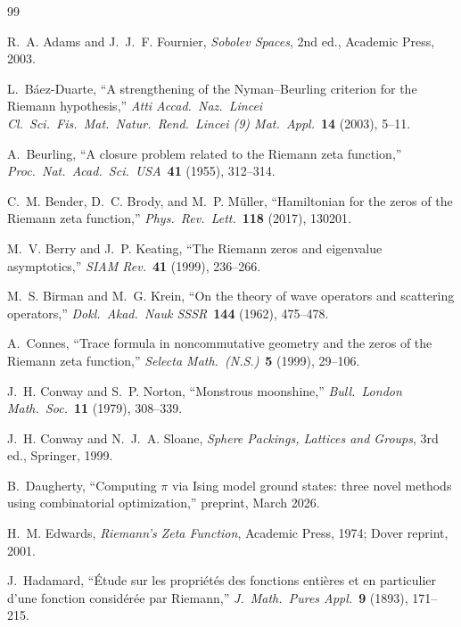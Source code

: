 \documentclass[11pt,a4paper]{article}
\theoremstyle{plain}
\theoremstyle{remark}
\begin{document}
\begin{thebibliography}{99}

R.~A. Adams and J.~J.~F. Fournier,
\emph{Sobolev Spaces}, 2nd ed., Academic Press, 2003.

L.~B\'aez-Duarte,
``A strengthening of the Nyman--Beurling criterion for the Riemann
hypothesis,''
\emph{Atti Accad.\ Naz.\ Lincei Cl.\ Sci.\ Fis.\ Mat.\ Natur.\
Rend.\ Lincei (9) Mat.\ Appl.}\ \textbf{14} (2003), 5--11.

A.~Beurling,
``A closure problem related to the Riemann zeta function,''
\emph{Proc.\ Nat.\ Acad.\ Sci.\ USA}\ \textbf{41} (1955), 312--314.

C.~M. Bender, D.~C. Brody, and M.~P. M\"uller,
``Hamiltonian for the zeros of the Riemann zeta function,''
\emph{Phys.\ Rev.\ Lett.}\ \textbf{118} (2017), 130201.

M.~V. Berry and J.~P. Keating,
``The Riemann zeros and eigenvalue asymptotics,''
\emph{SIAM Rev.}\ \textbf{41} (1999), 236--266.

M.~S. Birman and M.~G. Krein,
``On the theory of wave operators and scattering operators,''
\emph{Dokl.\ Akad.\ Nauk SSSR}\ \textbf{144} (1962), 475--478.

A.~Connes,
``Trace formula in noncommutative geometry and the zeros of the Riemann
zeta function,''
\emph{Selecta Math.\ (N.S.)}\ \textbf{5} (1999), 29--106.

J.~H. Conway and S.~P. Norton,
``Monstrous moonshine,''
\emph{Bull.\ London Math.\ Soc.}\ \textbf{11} (1979), 308--339.

J.~H. Conway and N.~J.~A. Sloane,
\emph{Sphere Packings, Lattices and Groups}, 3rd ed.,
Springer, 1999.

B.~Daugherty,
``Computing $\pi$ via Ising model ground states: three novel methods
using combinatorial optimization,''
preprint, March 2026.

H.~M. Edwards,
\emph{Riemann's Zeta Function},
Academic Press, 1974; Dover reprint, 2001.

J.~Hadamard,
``\'Etude sur les propri\'et\'es des fonctions enti\`eres et en
particulier d'une fonction consid\'er\'ee par Riemann,''
\emph{J.\ Math.\ Pures Appl.}\ \textbf{9} (1893), 171--215.


\end{thebibliography}
\end{document}
